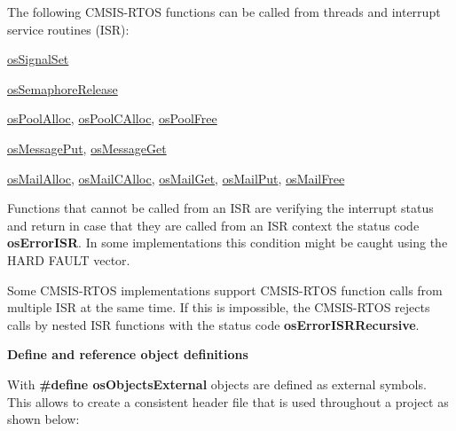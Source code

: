 The following C\+M\+S\+I\+S-\/\+R\+T\+OS functions can be called from threads and interrupt service routines (I\+SR)\+:
\begin{DoxyItemize}
\item \mbox{\hyperlink{cmsis__os_8h_a3de2730654589d6c3559c4b9e2825553}{os\+Signal\+Set}}
\item \mbox{\hyperlink{cmsis__os_8h_ab108914997c49e14d8ff1ae0d1988ca0}{os\+Semaphore\+Release}}
\item \mbox{\hyperlink{cmsis__os_8h_ab4bc93bf17f94ca99363e53e1a763fb5}{os\+Pool\+Alloc}}, \mbox{\hyperlink{cmsis__os_8h_ab22c2f194e0f0b05494aa0e9c97d7a51}{os\+Pool\+C\+Alloc}}, \mbox{\hyperlink{cmsis__os_8h_a4a861e9c469c9d0daf5721bf174f8e54}{os\+Pool\+Free}}
\item \mbox{\hyperlink{cmsis__os_8h_ac0dcf462fc92de8ffaba6cc004514a6d}{os\+Message\+Put}}, \mbox{\hyperlink{cmsis__os_8h_a6c6892b8f2296cca6becd57ca2d7e1ae}{os\+Message\+Get}}
\item \mbox{\hyperlink{cmsis__os_8h_ac985d7f260b80d7891157697b760aa02}{os\+Mail\+Alloc}}, \mbox{\hyperlink{cmsis__os_8h_a9e492e5839bf0d2bf66492e70eae3ddb}{os\+Mail\+C\+Alloc}}, \mbox{\hyperlink{cmsis__os_8h_ac6ad7e6e7d6c4a80e60da22c57a42ccd}{os\+Mail\+Get}}, \mbox{\hyperlink{cmsis__os_8h_a485ef6f81854ebda8ffbce4832181e02}{os\+Mail\+Put}}, \mbox{\hyperlink{cmsis__os_8h_a27c1060cf21393f96b4fd1ed1c0167cc}{os\+Mail\+Free}}
\end{DoxyItemize}

Functions that cannot be called from an I\+SR are verifying the interrupt status and return in case that they are called from an I\+SR context the status code {\bfseries{os\+Error\+I\+SR}}. In some implementations this condition might be caught using the H\+A\+RD F\+A\+U\+LT vector.

Some C\+M\+S\+I\+S-\/\+R\+T\+OS implementations support C\+M\+S\+I\+S-\/\+R\+T\+OS function calls from multiple I\+SR at the same time. If this is impossible, the C\+M\+S\+I\+S-\/\+R\+T\+OS rejects calls by nested I\+SR functions with the status code {\bfseries{os\+Error\+I\+S\+R\+Recursive}}.

{\bfseries{Define and reference object definitions}}

With {\bfseries{\#define os\+Objects\+External}} objects are defined as external symbols. This allows to create a consistent header file that is used throughout a project as shown below\+:

